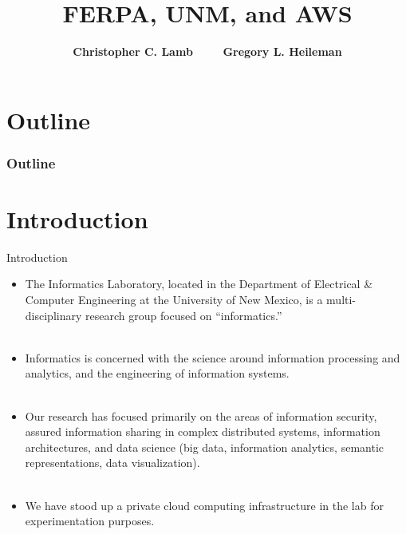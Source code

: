 \documentclass[t,handout]{beamer}   %
\title[FERPA, UNM, and AWS]
{FERPA, UNM, and AWS}
\author[Lamb, Heileman] %
{\bf Christopher C. Lamb \ \ \ \ Gregory L. Heileman}
\institute[]
{Informatics Laboratory \\
Department of Electrical \& Computer Engineering \\
University of New Mexico}
\date[June 26, 2015]
\begin{document}
\begin{frame}
  \titlepage
\end{frame}



\section*{Outline}

\begin{frame}  \frametitle{Outline}  
	\tableofcontents
\end{frame}

\section{Introduction}

\begin{frame}{Introduction}
\begin{itemize}
\vspace*{-0.2in}
 \item The Informatics Laboratory, located in the Department of Electrical \& Computer Engineering at the University of New Mexico, is a multi-disciplinary research group focused on ``informatics.''~\\~\\
 \pause
 \item Informatics is concerned with the science around information processing and analytics, and the engineering of information systems.~\\~\\
 \pause
 \item Our research has focused primarily on the areas of information security, assured information sharing in complex distributed systems,  information architectures, and data science (big data, information analytics, semantic representations, data visualization).~\\~\\
 \pause
 \item We have stood up a private cloud computing infrastructure in the lab for experimentation purposes.
 \end{itemize}
\end{frame}
\end{document}
